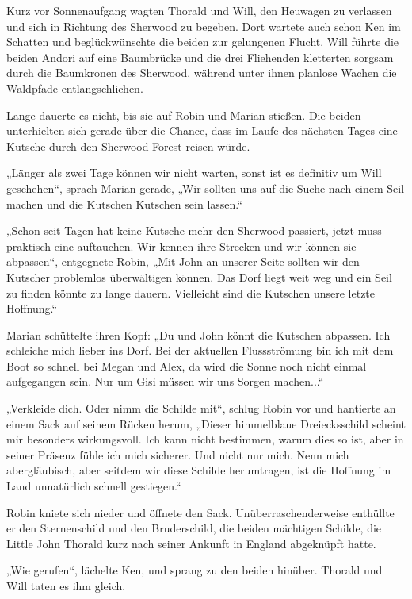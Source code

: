 \trennzeichen



Kurz vor Sonnenaufgang wagten Thorald und Will, den Heuwagen zu verlassen und sich in Richtung des Sherwood zu begeben. Dort wartete auch schon Ken im Schatten und beglückwünschte die beiden zur gelungenen Flucht. Will führte die beiden Andori auf eine Baumbrücke und die drei Fliehenden kletterten sorgsam durch die Baumkronen des Sherwood, während unter ihnen planlose Wachen die Waldpfade entlangschlichen.

Lange dauerte es nicht, bis sie auf Robin und Marian stießen. Die beiden unterhielten sich gerade über die Chance, dass im Laufe des nächsten Tages eine Kutsche durch den Sherwood Forest reisen würde.

„Länger als zwei Tage können wir nicht warten, sonst ist es definitiv um Will geschehen“, sprach Marian gerade, „Wir sollten uns auf die Suche nach einem Seil machen und die Kutschen Kutschen sein lassen.“

„Schon seit Tagen hat keine Kutsche mehr den Sherwood passiert, jetzt muss praktisch eine auftauchen. Wir kennen ihre Strecken und wir können sie abpassen“, entgegnete Robin, „Mit John an unserer Seite sollten wir den Kutscher problemlos überwältigen können. Das Dorf liegt weit weg und ein Seil zu finden könnte zu lange dauern. Vielleicht sind die Kutschen unsere letzte Hoffnung.“

Marian schüttelte ihren Kopf: „Du und John könnt die Kutschen abpassen. Ich schleiche mich lieber ins Dorf. Bei der aktuellen Flussströmung bin ich mit dem Boot so schnell bei Megan und Alex, da wird die Sonne noch nicht einmal aufgegangen sein. Nur um Gisi müssen wir uns Sorgen machen...“

„Verkleide dich. Oder nimm die Schilde mit“, schlug Robin vor und hantierte an einem Sack auf seinem Rücken herum, „Dieser himmelblaue Dreiecksschild scheint mir besonders wirkungsvoll. Ich kann nicht bestimmen, warum dies so ist, aber in seiner Präsenz fühle ich mich sicherer. Und nicht nur mich. Nenn mich abergläubisch, aber seitdem wir diese Schilde herumtragen, ist die Hoffnung im Land unnatürlich schnell gestiegen.“

Robin kniete sich nieder und öffnete den Sack. Unüberraschenderweise enthüllte er den Sternenschild und den Bruderschild, die beiden mächtigen Schilde, die Little John Thorald kurz nach seiner Ankunft in England abgeknüpft hatte.

„Wie gerufen“, lächelte Ken, und sprang zu den beiden hinüber. Thorald und Will taten es ihm gleich.

